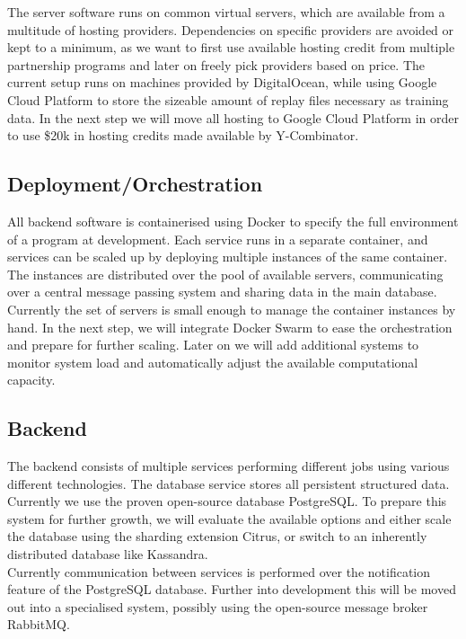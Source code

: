 \documentclass[12pt]{article} %
\begin{document}
The server software runs on common virtual servers, which are available from a multitude of hosting providers. Dependencies on specific providers are avoided or kept to a minimum, as we want to first use available hosting credit from multiple partnership programs and later on freely pick providers based on price. The current setup runs on machines provided by DigitalOcean, while using Google Cloud Platform to store the sizeable amount of replay files necessary as training data. In the next step we will move all hosting to Google Cloud Platform in order to use \$20k in hosting credits made available by Y-Combinator. 

\subsection{Deployment/Orchestration}

All backend software is containerised using Docker to specify the full environment of a program at development. Each service runs in a separate container, and services can be scaled up by deploying multiple instances of the same container. The instances are distributed over the pool of available servers, communicating over a central message passing system and sharing data in the main database.\\ 

Currently the set of servers is small enough to manage the container instances by hand. In the next step, we will integrate Docker Swarm to ease the orchestration and prepare for further scaling. Later on we will add additional systems to monitor system load and automatically adjust the available computational capacity.

\subsection{Backend}

The backend consists of multiple services performing different jobs using various different technologies. The database service stores all persistent structured data. Currently we use the proven open-source database PostgreSQL. To prepare this system for further growth, we will evaluate the available options and either scale the database using the sharding extension Citrus, or switch to an inherently distributed database like Kassandra.\\

Currently communication between services is performed over the notification feature of the PostgreSQL database. Further into development this will be moved out into a specialised system, possibly using the open-source message broker RabbitMQ.\\ 
\end{document}

